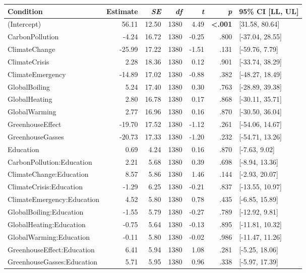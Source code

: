 \begin{table}[ht]
\centering
\begin{tabular}{lrrrrrl}
  \hline
Condition & Estimate & \textit{SE} & \textit{df} & \textit{t} & \textit{p} & 95\% CI [LL, UL] \\ 
  \hline
(Intercept) & 56.11 & 12.50 & 1380 & 4.49 & \textbf{\textless  .001} & [31.58, 80.64] \\ 
  CarbonPollution & -4.24 & 16.72 & 1380 & -0.25 & .800 & [-37.04, 28.55] \\ 
  ClimateChange & -25.99 & 17.22 & 1380 & -1.51 & .131 & [-59.76, 7.79] \\ 
  ClimateCrisis & 2.28 & 18.36 & 1380 & 0.12 & .901 & [-33.74, 38.29] \\ 
  ClimateEmergency & -14.89 & 17.02 & 1380 & -0.88 & .382 & [-48.27, 18.49] \\ 
  GlobalBoiling & 5.24 & 17.40 & 1380 & 0.30 & .763 & [-28.89, 39.38] \\ 
  GlobalHeating & 2.80 & 16.78 & 1380 & 0.17 & .868 & [-30.11, 35.71] \\ 
  GlobalWarming & 2.77 & 16.96 & 1380 & 0.16 & .870 & [-30.50, 36.04] \\ 
  GreenhouseEffect & -19.70 & 17.52 & 1380 & -1.12 & .261 & [-54.06, 14.67] \\ 
  GreenhouseGasses & -20.73 & 17.33 & 1380 & -1.20 & .232 & [-54.71, 13.26] \\ 
  Education & 0.69 & 4.24 & 1380 & 0.16 & .870 & [-7.63, 9.02] \\ 
  CarbonPollution:Education & 2.21 & 5.68 & 1380 & 0.39 & .698 & [-8.94, 13.36] \\ 
  ClimateChange:Education & 8.57 & 5.86 & 1380 & 1.46 & .144 & [-2.93, 20.07] \\ 
  ClimateCrisis:Education & -1.29 & 6.25 & 1380 & -0.21 & .837 & [-13.55, 10.97] \\ 
  ClimateEmergency:Education & 4.52 & 5.80 & 1380 & 0.78 & .435 & [-6.85, 15.89] \\ 
  GlobalBoiling:Education & -1.55 & 5.79 & 1380 & -0.27 & .789 & [-12.92, 9.81] \\ 
  GlobalHeating:Education & -0.75 & 5.64 & 1380 & -0.13 & .895 & [-11.81, 10.32] \\ 
  GlobalWarming:Education & -0.11 & 5.80 & 1380 & -0.02 & .986 & [-11.47, 11.26] \\ 
  GreenhouseEffect:Education & 6.41 & 5.94 & 1380 & 1.08 & .281 & [-5.25, 18.06] \\ 
  GreenhouseGasses:Education & 5.71 & 5.95 & 1380 & 0.96 & .338 & [-5.97, 17.39] \\ 
   \hline
\end{tabular}
\end{table}

